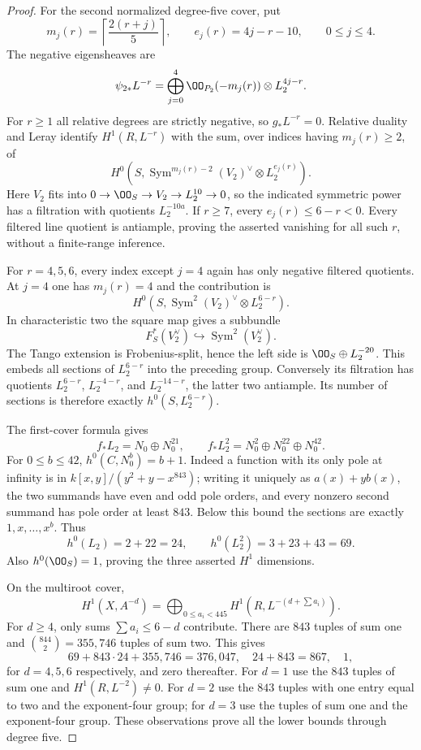 \begin{proof}
For the second normalized degree-five cover, put
\[
 m_j(r)=\left\lceil\frac{2(r+j)}5\right\rceil,
 \qquad e_j(r)=4j-r-10,\qquad0\leq j\leq4.
\]
The negative eigensheaves are
\[
 \psi_{2*}L^{-r}
  =\bigoplus_{j=0}^4\OO_{P_2}(-m_j(r))\otimes L_2^{4j-r}.
\]
For $r\geq1$ all relative degrees are strictly negative, so $g_*L^{-r}=0$.  Relative duality and Leray identify $H^1(R,L^{-r})$ with the sum, over indices having $m_j(r)\geq2$, of
\begin{equation}\label{eq:OC-negative-R1}
 H^0\!\left(S,\operatorname{Sym}^{m_j(r)-2}(V_2)^\vee
                                  \otimes L_2^{e_j(r)}\right).
\end{equation}
Here $V_2$ fits into $0\to\OO_S\to V_2\to L_2^{10}\to0$, so the indicated symmetric power has a filtration with quotients $L_2^{-10a}$.
If $r\geq7$, every $e_j(r)\leq6-r<0$.  Every filtered line quotient is antiample, proving the asserted vanishing for all such $r$, without a finite-range inference.

For $r=4,5,6$, every index except $j=4$ again has only negative filtered quotients.  At $j=4$ one has $m_j(r)=4$ and the contribution is
\[
        H^0(S,\operatorname{Sym}^2(V_2)^\vee\otimes L_2^{6-r}).
\]
In characteristic two the square map gives a subbundle
\[
 F_S^*(V_2^\vee)\hookrightarrow\operatorname{Sym}^2(V_2^\vee).
\]
The Tango extension is Frobenius-split, hence the left side is
$\OO_S\oplus L_2^{-20}$.  This embeds all sections of $L_2^{6-r}$ into the preceding group.  Conversely its filtration has quotients
$L_2^{6-r}$, $L_2^{-4-r}$, and $L_2^{-14-r}$, the latter two antiample.  Its number of sections is therefore exactly $h^0(S,L_2^{6-r})$.

The first-cover formula gives
\[
 f_*L_2=N_0\oplus N_0^{21},\qquad
 f_*L_2^2=N_0^2\oplus N_0^{22}\oplus N_0^{42}.
\]
For $0\leq b\leq42$, $h^0(C,N_0^b)=b+1$.  Indeed a function with its only pole at infinity is in
$k[x,y]/(y^2+y-x^{843})$; writing it uniquely as $a(x)+y b(x)$, the two summands have even and odd pole orders, and every nonzero second summand has pole order at least $843$.  Below this bound the sections are exactly $1,x,\ldots,x^b$.  Thus
\[
       h^0(L_2)=2+22=24,\qquad h^0(L_2^2)=3+23+43=69.
\]
Also $h^0(\OO_S)=1$, proving the three asserted $H^1$ dimensions.

On the multiroot cover,
\[
 H^1(X,A^{-d})=
  \bigoplus_{0\leq a_i<445}H^1(R,L^{-(d+\sum a_i)}).
\]
For $d\geq4$, only sums $\sum a_i\leq6-d$ contribute.  There are $843$ tuples of sum one and $\binom{844}{2}=355{,}746$ tuples of sum two.  This gives
\[
 69+843\cdot24+355{,}746=376{,}047,\quad
 24+843=867,\quad1,
\]
for $d=4,5,6$ respectively, and zero thereafter.
For $d=1$ use the $843$ tuples of sum one and $H^1(R,L^{-2})\ne0$.  For $d=2$ use the $843$ tuples with one entry equal to two and the exponent-four group; for $d=3$ use the tuples of sum one and the exponent-four group.  These observations prove all the lower bounds through degree five.
\end{proof}

